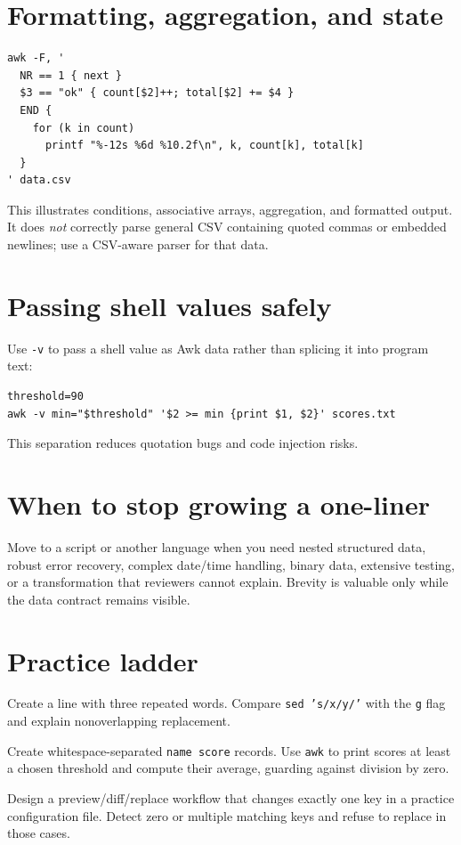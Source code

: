 \documentclass[11pt,oneside,openany]{book}
\begin{document}
\section{Formatting, aggregation, and state}
\begin{lstlisting}
awk -F, '
  NR == 1 { next }
  $3 == "ok" { count[$2]++; total[$2] += $4 }
  END {
    for (k in count)
      printf "%-12s %6d %10.2f\n", k, count[k], total[k]
  }
' data.csv
\end{lstlisting}
This illustrates conditions, associative arrays, aggregation, and formatted output. It does \emph{not} correctly parse general CSV containing quoted commas or embedded newlines; use a CSV-aware parser for that data.

\section{Passing shell values safely}
Use \texttt{-v} to pass a shell value as Awk data rather than splicing it into program text:
\begin{lstlisting}
threshold=90
awk -v min="$threshold" '$2 >= min {print $1, $2}' scores.txt
\end{lstlisting}
This separation reduces quotation bugs and code injection risks.

\section{When to stop growing a one-liner}
Move to a script or another language when you need nested structured data, robust error recovery, complex date/time handling, binary data, extensive testing, or a transformation that reviewers cannot explain. Brevity is valuable only while the data contract remains visible.

\section{Practice ladder}
\begin{practicebox}[title={Easy -- substitution scope}]
Create a line with three repeated words. Compare \texttt{sed 's/x/y/'} with the \texttt{g} flag and explain nonoverlapping replacement.
\end{practicebox}
\begin{practicebox}[title={Medium -- aggregate}]
Create whitespace-separated \texttt{name score} records. Use \texttt{awk} to print scores at least a chosen threshold and compute their average, guarding against division by zero.
\end{practicebox}
\begin{practicebox}[title={Hard -- safe configuration edit}]
Design a preview/diff/replace workflow that changes exactly one key in a practice configuration file. Detect zero or multiple matching keys and refuse to replace in those cases.
\end{practicebox}
\end{document}
